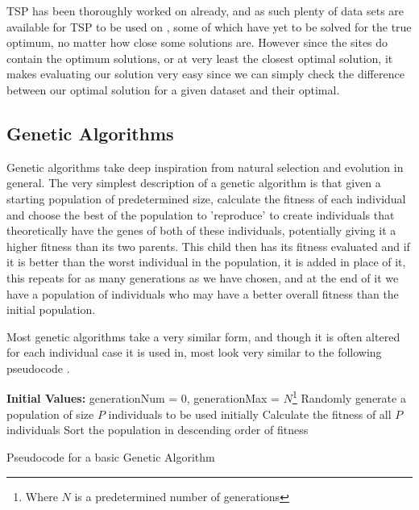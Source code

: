\documentclass[11pt,a4paper,titlepage]{article}
\begin{document}
TSP has been thoroughly worked on already, and as such plenty of data sets are available for TSP to be used on \cite{TSPRep1, TSPRep2}, some of which have yet to be solved for the true optimum, no matter how close some solutions are. However since the sites do contain the optimum solutions, or at very least the closest optimal solution, it makes evaluating our solution very easy since we can simply check the difference between our optimal solution for a given dataset and their optimal.

\subsection{Genetic Algorithms}
Genetic algorithms take deep inspiration from natural selection and evolution in general. The very simplest description of a genetic algorithm is that given a starting population of predetermined size, calculate the fitness of each individual and choose the best of the population to 'reproduce' to create individuals that theoretically have the genes of both of these individuals, potentially giving it a higher fitness than its two parents. This child then has its fitness evaluated and if it is better than the worst individual in the population, it is added in place of it, this repeats for as many generations as we have chosen, and at the end of it we have a population of individuals who may have a better overall fitness than the initial population.

Most genetic algorithms take a very similar form, and though it is often altered for each individual case it is used in, most look very similar to the following pseudocode \cite{GAIntro}.
\clearpage

\begin{algorithm}[H]
\SetAlgoLined
\textbf{Initial Values:} generationNum = 0, generationMax = $N$\footnote{Where $N$ is a predetermined number of generations}\;
Randomly generate a population of size $P$ individuals to be used initially\;
Calculate the fitness of all $P$ individuals\;
Sort the population in descending order of fitness\;
\caption{Pseudocode for a basic Genetic Algorithm}
\end{algorithm}
\end{document}
